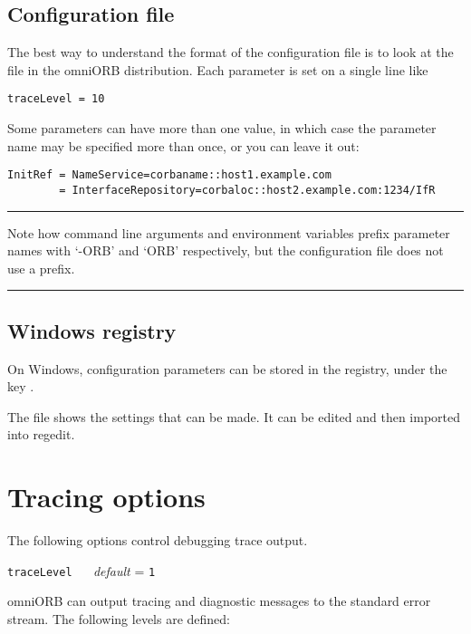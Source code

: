 \documentclass[11pt,oneside,a4paper]{book}
\makeatletter
\newcommand{\code}[1]{\texttt{#1}}
\newenvironment{statement}%
 {\noindent\begin{minipage}{\textwidth}%
  \vspace{.5\baselineskip}%
  \noindent\rule{\textwidth}{2pt}%
  \vspace{.25\baselineskip}%
  \begin{list}{}{\setlength{\listparindent}{0em}%
                 \setlength{\itemindent}{0em}%
                 \setlength{\leftmargin}{1.5em}%
                 \setlength{\rightmargin}{\leftmargin}%
                 \setlength{\topsep}{0pt}%
                 \setlength{\partopsep}{0pt}}
  \item\relax}
 {\end{list}%
  \vspace{-.25\baselineskip}%
  \noindent\rule{\textwidth}{2pt}%
  \vspace{.5\baselineskip}%
  \end{minipage}}
\newcommand{\confopt}[2]
  {\vspace{\baselineskip}\par\noindent\code{#1} ~~ \textit{default} =
   \code{#2}}
\renewcommand{\confopt}[2]
  {\vspace{\baselineskip}\par\noindent\code{#1} ~~ \textit{default} =
   \code{#2}\\[-1ex]\@afterheading}
\makeatother
\begin{document}
\subsection{Configuration file}

The best way to understand the format of the configuration file is to
look at the  file in the omniORB distribution. Each
parameter is set on a single line like

\begin{verbatim}
traceLevel = 10
\end{verbatim}

Some parameters can have more than one value, in which case the
parameter name may be specified more than once, or you can leave it
out:

\begin{verbatim}
InitRef = NameService=corbaname::host1.example.com
        = InterfaceRepository=corbaloc::host2.example.com:1234/IfR
\end{verbatim}


\begin{statement}
Note how command line arguments and environment variables prefix
parameter names with `-ORB' and `ORB' respectively, but the
configuration file does not use a prefix.
\end{statement}


\subsection{Windows registry}

On Windows, configuration parameters can be stored in the registry,
under the key .

The file  shows the settings that can be made. It can
be edited and then imported into regedit.



\section{Tracing options}

The following options control debugging trace output.


\confopt{traceLevel}{1}

omniORB can output tracing and diagnostic messages to the standard
error stream. The following levels are defined:

\vspace{\baselineskip}
\end{document}
